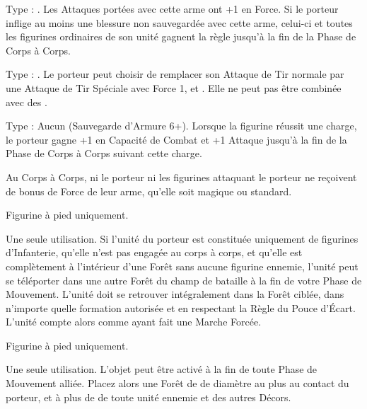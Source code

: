 Type : \spear{}. Les Attaques portées avec cette arme ont +1 en Force. Si le porteur inflige au moins une blessure non sauvegardée avec cette arme, celui-ci et toutes les figurines ordinaires de son unité gagnent la règle \distracting{} jusqu'à la fin de la Phase de Corps à Corps.

Type : \longbow{}. Le porteur peut choisir de remplacer son Attaque de Tir normale par une Attaque de Tir Spéciale avec Force 1, \poisonedattacks{} et . Elle ne peut pas être combinée avec des \feyarrows{}.

\endpricelist

\armymagicalarmour

\startpricelist

Type : Aucun (Sauvegarde d'Armure 6+). Lorsque la figurine réussit une charge, le porteur gagne +1 en Capacité de Combat et +1 Attaque jusqu'à la fin de la Phase de Corps à Corps suivant cette charge.

\endpricelist

\armytalismans

\startpricelist

Au Corps à Corps, ni le porteur ni les figurines attaquant le porteur ne reçoivent de bonus de Force de leur arme, qu'elle soit magique ou standard.

\endpricelist

\armyenchanteditems

\startpricelist

Figurine à pied uniquement.

Une seule utilisation. Si l'unité du porteur est constituée uniquement de figurines d'Infanterie, qu'elle n'est pas engagée au corps à corps, et qu'elle est complètement à l'intérieur d'une Forêt sans aucune figurine ennemie, l'unité peut se téléporter dans une autre Forêt du champ de bataille à la fin de votre Phase de Mouvement. L'unité doit se retrouver intégralement dans la Forêt ciblée, dans n'importe quelle formation autorisée et en respectant la Règle du Pouce d'Écart. L'unité compte alors comme ayant fait une Marche Forcée.

Figurine à pied uniquement.

Une seule utilisation. L'objet peut être activé à la fin de toute Phase de Mouvement alliée. Placez alors une Forêt de  de diamètre au plus au contact du porteur, et à plus de  de toute unité ennemie et des autres Décors.

